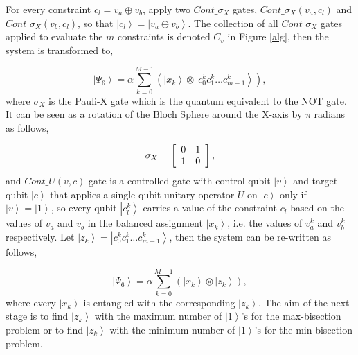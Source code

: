 \documentclass[a4paper]{article}
\begin{document}
For every constraint $c_l=v_a \oplus v_b$, apply two $Cont\_\sigma_X$ gates, $Cont\_\sigma_X(v_a,c_l)$ and $Cont\_\sigma_X(v_b,c_l)$, so that 
$\left|c_l\right\rangle=\left|v_a\oplus v_b\right\rangle$. The collection of all 
$Cont\_\sigma_X$ gates applied to evaluate the $m$ constraints is denoted $C_v$ in Figure \ref{alg}, 
then the system is transformed to,

\begin{equation}
\left| {\Psi _6 } \right\rangle  = \alpha \sum\limits_{k = 0}^{M - 1} 
{\left( {\left| x_k \right\rangle  \otimes \left| {c_0^k c_1^k  \ldots c_{m-1}^k } \right\rangle } \right)}, 
\end{equation}
\noindent
where $\sigma _X$ is the Pauli-X gate which is the quantum equivalent to 
the NOT gate. It can be seen as a rotation of the Bloch Sphere around the X-axis by $\pi$ radians as follows,

\begin{equation}
\sigma _X  = \left[ {\begin{array}{*{20}c}
   0 & 1  \\
   1 & 0  \\
\end{array}} \right],
\end{equation}
and $Cont\_U(v,c)$ gate is a controlled gate with control qubit $\left|v\right\rangle$ and target qubit $\left|c\right\rangle$ 
that applies a single qubit unitary operator $U$ on $\left|c\right\rangle$ only if $\left|v\right\rangle=\left|1\right\rangle$, 
so every qubit $\left|c_l^k\right\rangle$ carries a value of the constraint $c_l$ based on the values of 
$v_a$ and $v_b$ in the balanced assignment $\left| x_k \right\rangle$, i.e. the values of $v_a^k$ and $v_b^k$ respectively. 
Let $\left| z_k \right\rangle=\left|{c_0^k c_1^k \ldots c_{m-1}^k }\right\rangle$, then the system can 
be re-written as follows,

\begin{equation}
\left| {\Psi _6 } \right\rangle  = \alpha \sum\limits_{k = 0}^{M - 1} 
{\left( {\left| x_k \right\rangle  \otimes \left| {z_k} \right\rangle } \right)}, 
\end{equation}
\noindent
where every $\left| x_k \right\rangle$ is entangled with the corresponding $\left| z_k \right\rangle$. 
The aim of the next stage is to find $\left| z_k \right\rangle$ with the maximum number of 
$\left| 1 \right\rangle$'s for the max-bisection problem or to find $\left| z_k \right\rangle$ with 
the minimum number of $\left| 1 \right\rangle$'s for the min-bisection problem.
  
\end{document}
